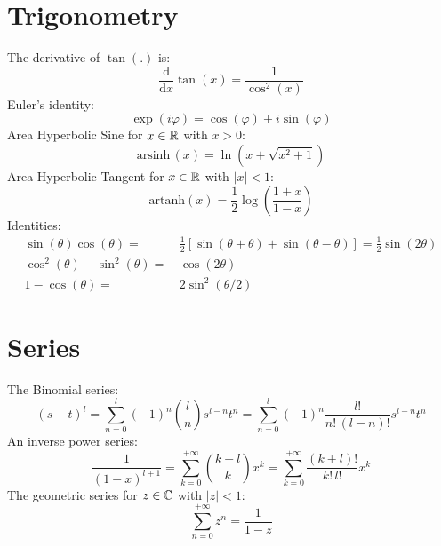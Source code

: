 \FloatBarrier
\section{Trigonometry}
The derivative of $\tan(.)$ is:
\begin{equation}
  \frac{\mathrm{d}}{\mathrm{d}x} \tan(x) = \frac{1}{\cos^2(x)} \label{eqn:tan_derivative}
\end{equation}
Euler's identity:
\begin{equation}
  \exp(i \varphi) = \cos(\varphi) + i \sin(\varphi) \label{eqn:eulers_identity}
\end{equation}
Area Hyperbolic Sine for $x \in \mathbb{R}$ with $x>0$:
\begin{equation}
  \mathrm{arsinh}\,(x) = \ln \left( x + \sqrt{x^2 + 1} \right) \label{eqn:arsinh}
\end{equation}
Area Hyperbolic Tangent for $x \in \mathbb{R}$ with $|x|<1$:
\begin{equation}
  \mathrm{artanh}(x) = \frac{1}{2} \log\left(\frac{1 + x}{1 - x} \right)
\end{equation}
Identities:
\begin{align}
  \sin(\theta) \cos(\theta)       =&\, \frac{1}{2} \left[ \sin(\theta + \theta) + \sin(\theta - \theta) \right] = \frac{1}{2} \sin(2 \theta) \label{eqn:trigid_1} \\
  \cos^2(\theta) - \sin^2(\theta) =&\, \cos(2 \theta) \label{eqn:trigid_2} \\
  1 - \cos(\theta)                =&\, 2 \sin^2(\theta/2)
\end{align}

\FloatBarrier
\section{Series}
The Binomial series:
\begin{equation}
  (s-t)^l = \sum\limits_{n=0}^{l} (-1)^{n} {\genfrac(){0pt}{0}{l}{n}} s^{l-n} t^{n}
          = \sum\limits_{n=0}^{l} (-1)^{n} \frac{l!}{n!\, (l-n)!} s^{l-n} t^{n}
\end{equation}
An inverse power series:
\begin{equation}
  \frac{1}{(1-x)^{l+1}} = \sum\limits_{k=0}^{+\infty} {\genfrac(){0pt}{0}{k+l}{k}} x^k
                        = \sum\limits_{k=0}^{+\infty} \frac{(k+l)!}{k!\, l!} x^k
\end{equation}
The geometric series for $z \in \mathbb{C}$ with $|z|<1$:
\begin{equation}
  \sum_{n=0}^{+\infty} z^n = \frac{1}{1-z} \label{eqn:geometric_series}
\end{equation}

